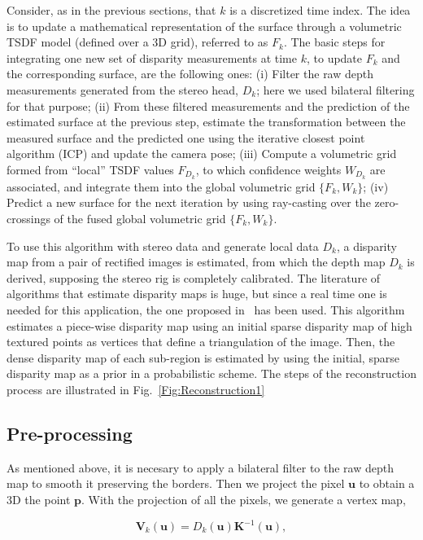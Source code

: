 Consider, as in the previous sections, that $k$ is a discretized time index. The idea is to update a mathematical representation of the surface through a volumetric TSDF model (defined over a 3D grid), referred to as $F_k$. The basic steps for integrating one new set of disparity measurements at time $k$, to update $F_k$ and the corresponding surface, are the following ones: (i) Filter the raw depth measurements generated from the stereo head, $D_k$; here we used bilateral filtering for that purpose; (ii) From these filtered measurements and the prediction of the estimated surface at the previous step, estimate the transformation between the measured surface and the predicted one using the iterative closest point algorithm (ICP) and update the camera pose; (iii) Compute a volumetric grid formed from ``local'' TSDF values $F_{D_k}$, to which confidence weights $W_{D_k}$ are associated, and integrate them into the global volumetric grid $\{F_k,W_k\}$; (iv) Predict a new surface for the next iteration by using ray-casting over the zero-crossings of the fused global volumetric grid $\{F_k,W_k\}$. 

To use this algorithm with stereo data and generate local data $D_k$, a disparity map from a pair of rectified images is estimated, from which the depth map $D_k$ is derived, supposing the stereo rig is completely calibrated. The literature of algorithms that estimate disparity maps is huge, but since a real time one is needed for this application, the one proposed in~\citep{Geiger2010} has been used. This algorithm estimates a piece-wise disparity map using an initial sparse disparity map of high textured points as vertices that define a triangulation of the image. Then, the dense disparity map of each sub-region is estimated by using the initial, sparse disparity map as a prior in a probabilistic scheme. The steps of the reconstruction process are illustrated in Fig.~\ref{Fig:Reconstruction1}

\subsection{Pre-processing}
As mentioned above, it is necesary to apply a bilateral filter to the raw depth map to smooth it preserving the borders.
Then we project the pixel $\mathbf{u}$ to obtain a 3D the point $\mathbf{p}$. With the projection of all the pixels, we generate a vertex map,

\begin{equation}
 \mathbf{V}_k(\mathbf{u}) = D_k(\mathbf{u})\mathbf{K}^{-1}(\mathbf{u}),
\end{equation}

